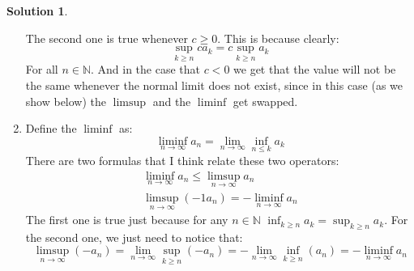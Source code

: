 \documentclass{article}
\theoremstyle{definition}
\newtheorem*{soln}{Solution}
\theoremstyle{theorem}
\newcommand{\N}{\mathbb{N}}
\begin{document}
\begin{soln}
\begin{enumerate}
            The second one is true whenever $c\geq 0$. This is because clearly:
            $$\sup_{k\geq n} ca_k= c\sup_{k\geq n} a_k$$
            For all $n\in \N$. And in the case that $c<0$ we get that the value will not be the same whenever the normal limit does not exist, since in this case (as we show below) the $\limsup$ and the $\liminf$ get swapped.    
        \item Define the $\liminf$ as:
            $$\liminf_{n\to \infty} a_n = \lim_{n\to \infty} \inf_{n\leq k}a_k$$
            There are two formulas that I think relate these two operators:
            \begin{gather*}
                \liminf_{n\to \infty} a_n \leq \limsup_{n\to \infty} a_n\\
                \limsup_{n\to \infty} (-1 a_n) = -\liminf_{n\to \infty} a_n
            \end{gather*}
            The first one is true just because for any $n\in \N$ $\inf_{k\geq n} a_k= \sup_{k\geq n} a_k$. For the second one, we just need to notice that:
            $$\limsup_{n\to \infty} (-a_n) = \lim_{n\to \infty} \sup_{k\geq n} (-a_n) =-\lim_{n\to \infty} \inf_{k\geq n} (a_n) =- \liminf_{n\to \infty} a_n  $$

    \end{enumerate}
\end{soln}
\vspace{1in}
\end{document}

